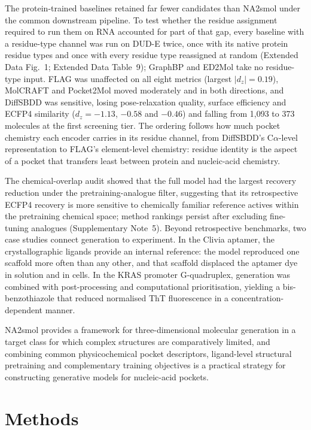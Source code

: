 \documentclass[pdflatex,sn-mathphys-num]{sn-jnl}
\theoremstyle{thmstyleone}
\theoremstyle{thmstyletwo}
\theoremstyle{thmstylethree}
\begin{document}
The protein-trained baselines retained far fewer candidates than NA2smol under the common downstream pipeline. To test whether the residue assignment required to run them on RNA accounted for part of that gap, every baseline with a residue-type channel was run on DUD-E twice, once with its native protein residue types and once with every residue type reassigned at random (Extended Data Fig.~1; Extended Data Table~9); GraphBP and ED2Mol take no residue-type input. FLAG was unaffected on all eight metrics (largest $|d_z|=0.19$), MolCRAFT and Pocket2Mol moved moderately and in both directions, and DiffSBDD was sensitive, losing pose-relaxation quality, surface efficiency and ECFP4 similarity ($d_z=-1.13$, $-0.58$ and $-0.46$) and falling from 1,093 to 373 molecules at the first screening tier. The ordering follows how much pocket chemistry each encoder carries in its residue channel, from DiffSBDD's C$\alpha$-level representation to FLAG's element-level chemistry: residue identity is the aspect of a pocket that transfers least between protein and nucleic-acid chemistry.

The chemical-overlap audit showed that the full model had the largest recovery reduction under the pretraining-analogue filter, suggesting that its retrospective ECFP4 recovery is more sensitive to chemically familiar reference actives within the pretraining chemical space; method rankings persist after excluding fine-tuning analogues (Supplementary Note~5). Beyond retrospective benchmarks, two case studies connect generation to experiment. In the Clivia aptamer, the crystallographic ligands provide an internal reference: the model reproduced one scaffold more often than any other, and that scaffold displaced the aptamer dye in solution and in cells. In the KRAS promoter G-quadruplex, generation was combined with post-processing and computational prioritisation, yielding a bis-benzothiazole that reduced normalised ThT fluorescence in a concentration-dependent manner.

NA2smol provides a framework for three-dimensional molecular generation in a target class for which complex structures are comparatively limited, and combining common physicochemical pocket descriptors, ligand-level structural pretraining and complementary training objectives is a practical strategy for constructing generative models for nucleic-acid pockets.

\section{Methods}
\end{document}
